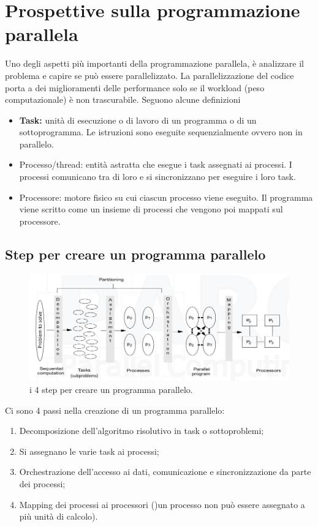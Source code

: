 \section{Prospettive sulla programmazione parallela}
Uno degli aspetti più importanti della programmazione parallela, è analizzare il problema e capire se può essere parallelizzato. La parallelizzazione del codice porta a dei miglioramenti delle performance solo se il workload (peso computazionale) è non trascurabile.
Seguono alcune definizioni
\begin{itemize}
    \item \textbf{Task: } unità di esecuzione o di lavoro di un programma o di un sottoprogramma. Le istruzioni sono eseguite sequenzialmente ovvero non in parallelo.

    \item Processo/thread: entità astratta che esegue i task assegnati ai processi. I processi comunicano tra di loro e si sincronizzano per eseguire i loro task.
    \item Processore: motore fisico su cui ciascun processo viene eseguito. Il programma viene scritto come un insieme di processi che vengono poi mappati sul processore.
\end{itemize}

\subsection{Step per creare un programma parallelo}
\begin{figure}[th]
	\centering
	\includegraphics[width=0.7\linewidth]{img/4-step-programma-parallelo}
	\caption{i 4 step per creare un programma parallelo.}
	\label{fig:4-step-programma-parallelo}
\end{figure}

Ci sono 4 passi nella creazione di un programma parallelo:
\begin{enumerate}
    \item Decomposizione dell'algoritmo risolutivo in task o sottoproblemi;
    \item Si assegnano le varie task ai processi; 
    \item Orchestrazione dell'accesso ai dati, comunicazione e sincronizzazione  da parte dei processi;
    \item Mapping dei processi ai processori ()un processo non può essere assegnato a più unità di calcolo).
\end{enumerate}

